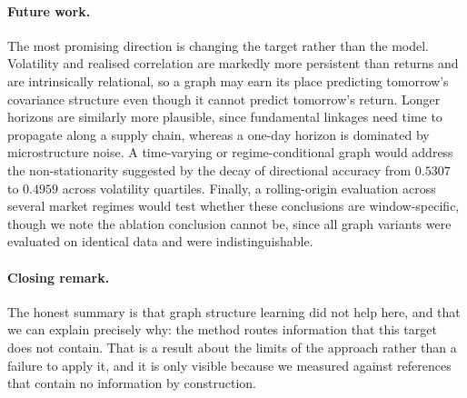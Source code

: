 \paragraph{Future work.} The most promising direction is changing the target rather than the model. Volatility and realised correlation are markedly more persistent than returns and are intrinsically relational, so a graph may earn its place predicting tomorrow's covariance structure even though it cannot predict tomorrow's return. Longer horizons are similarly more plausible, since fundamental linkages need time to propagate along a supply chain, whereas a one-day horizon is dominated by microstructure noise. A time-varying or regime-conditional graph would address the non-stationarity suggested by the decay of directional accuracy from $0.5307$ to $0.4959$ across volatility quartiles. Finally, a rolling-origin evaluation across several market regimes would test whether these conclusions are window-specific, though we note the ablation conclusion cannot be, since all graph variants were evaluated on identical data and were indistinguishable.

\paragraph{Closing remark.} The honest summary is that graph structure learning did not help here, and that we can explain precisely why: the method routes information that this target does not contain. That is a result about the limits of the approach rather than a failure to apply it, and it is only visible because we measured against references that contain no information by construction.
